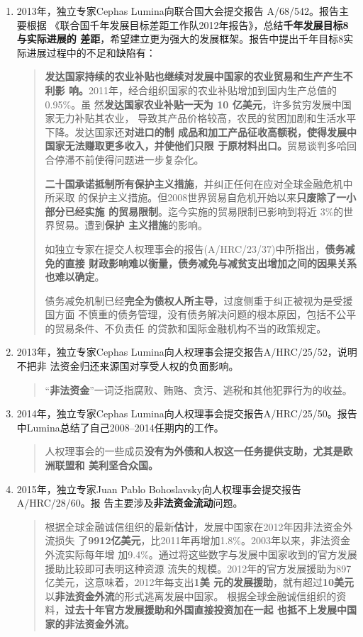 \begin{enumerate}
\item 2013年，独立专家Cephas Lumina向联合国大会提交报告 A/68/542。报告主要根据
  《联合国千年发展目标差距工作队2012年报告》，总结\textbf{千年发展目标8与实际进展的
    差距}，希望建立更为强大的发展框架。报告中提出千年目标8实际进展过程中的不足和缺陷有：
  \begin{quotation}
    \textbf{发达国家持续的农业补贴也继续对发展中国家的农业贸易和生产产生不利影
      响。}2011年，经合组织国家的农业补贴增加到国内生产总值的 0.95\%。虽
    然\textbf{发达国家农业补贴一天为 10 亿美元}，许多贫穷发展中国家无力补贴其农业，
    导致其产品价格较高，农民的贫困加剧和生活水平下降。发达国家还\textbf{对进口的制
      成品和加工产品征收高额税，使得发展中国家无法赚取更多收入，并使他们只限
      于原材料出口。}贸易谈判多哈回合停滞不前使得问题进一步复杂化。

    \textbf{二十国承诺抵制所有保护主义措施}，并纠正任何在应对全球金融危机中所采取
    的保护主义措施。但2008世界贸易自危机开始以来\textbf{只废除了一小部分已经实施
      的贸易限制}。迄今实施的贸易限制已影响到将近 3\%的世界贸易。遭到\textbf{保护
      主义措施}的影响。

    如独立专家在提交人权理事会的报告(A/HRC/23/37)中所指出，\textbf{债务减免的直接
      财政影响难以衡量，债务减免与减贫支出增加之间的因果关系也难以确定}。

    债务减免机制已经\textbf{完全为债权人所主导}，过度侧重于纠正被视为是受援国方面
    不慎重的债务管理，没有债务解决问题的根本原因，包括不公平的贸易条件、不负责任
    的贷款和国际金融机构不当的政策规定。
   \end{quotation}

 \item 2013年，独立专家Cephas Lumina向人权理事会提交报告A/HRC/25/52，说明不把非
   法资金归还来源国对享受人权的负面影响。
  \begin{quotation}
    “\textbf{非法资金}”一词泛指腐败、贿赂、贪污、逃税和其他犯罪行为的收益。
  \end{quotation}

\item 2014年，独立专家Cephas Lumina向人权理事会提交报告A/HRC/25/50。报告
  中Lumina总结了自己2008--2014任期内的工作。
  \begin{quotation}
    人权理事会的一些成员\textbf{没有为外债和人权这一任务提供支助，尤其是欧洲联盟和
      美利坚合众国。}
  \end{quotation}


\item 2015年，独立专家Juan Pablo Bohoslavsky向人权理事会提交报告A/HRC/28/60。报
  告主要涉及\textbf{非法资金流动}问题。
  \begin{quotation}
    根据全球金融诚信组织的最新\textbf{估计}，发展中国家在2012年因非法资金外流损失
    了\textbf{9912亿美元}，比2011年再增加1.8\%。2003年以来，非法资金外流实际每年增
    加9.4\%。通过将这些数字与发展中国家收到的官方发展援助比较即可表明这种资源
    流失的规模。2012年的官方发展援助为897亿美元，这意味着，2012年每支出\textbf{1美
      元的发展援助}，就有超过\textbf{10美元}以\textbf{非法资金外流}的形式逃离发展中国家。
    根据全球金融诚信组织的资料，\textbf{过去十年官方发展援助和外国直接投资加在一起
      也抵不上发展中国家的非法资金外流。}


\end{quotation}
\end{enumerate}

